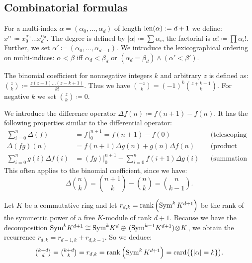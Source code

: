 \subsection{Combinatorial formulas}
\begin{definition}\label{multiindex}
For a multi-index $\alpha=(\alpha_0,\ldots,\alpha_d)$ of length $\operatorname{len}(\alpha):= d+1$ we define: $x^\alpha \coloneqq x_0^{\alpha_0}\ldots x_d^{\alpha_d}$. The degree is defined by $|\alpha |\coloneqq\sum\alpha_i$, the factorial is $\alpha! \coloneqq \prod \alpha_i!$. Further, we set
$\alpha'\coloneqq(\alpha_0,\ldots,\alpha_{d-1})$. We introduce the lexicographical ordering on multi-indices: $\alpha < \beta$ iff $\alpha_d < \beta_d$ or $(\alpha_d=\beta_d) \wedge (\alpha'<\beta')$.
\end{definition}
\begin{definition}
The binomial coefficient for nonnegative integers $k$ and arbitrary $z$ is defined as:
$\binom{z}{k} \coloneqq \frac{z(z-1)\ldots(z-k+1)}{k!}$. Thus we have $\binom{-z}{k}=(-1)^k\binom{z+k-1}{k}$. For negative $k$ we set $\binom{z}{k}\coloneqq 0$.
\end{definition}
We introduce the difference operator $\Delta f(n) \coloneqq f(n+1)-f(n)$. It has the following properties similar to the differential operator:
\begin{align}
 \sum_{i=0}^n \Delta(f) & = f\,\Big|_0^{n+1}= f(n+1)-f(0) && \text{(telescoping sum)} \\
 \Delta (fg)(n) &= f(n+1) \Delta g(n) + g(n)\Delta f(n) &&\text{(product rule)} \\
\label{sumbyparts}  \sum_{i=0}^n g(i)\Delta f(i) & = (fg)\Big|_0^{n+1} - \sum_{i=0}^n f(i+1)\Delta g(i) && \text{(summation by parts)}
\end{align}
This often applies to the binomial coefficient, since we have: 
\begin{equation} \label{binomdiff}
\textstyle \Delta \binom{n}{k}=\binom{n+1}{k}-\binom{n}{k} = \binom{n}{k-1}.
\end{equation}

Let $K$ be a commutative ring and let $r_{d,k} = \operatorname{rank} \left(\operatorname{Sym}^k K^{d+1} \right)$ be the rank of the symmetric power of a free $K$-module of rank $d\!+\!1$. 
Because we have the decomposition $\operatorname{Sym}^k\! K^{d+1} \cong \operatorname{Sym}^k\! K^d \oplus \,(\operatorname{Sym}^{k-1}\! K^{d+1})\!\otimes\! K$, we obtain the recurrence $r_{d,k} = r_{d-1,k} +r_{d,k-1}$. So we deduce:
\begin{equation} \label{binomcount} \textstyle
\binom{k+d}{d} =\binom{k+d}{k} = r_{d,k}=\operatorname{rank} \left(\operatorname{Sym}^k K^{d+1} \right) = \text{card}\big(\{|\alpha| =k\}\big).
\end{equation}


